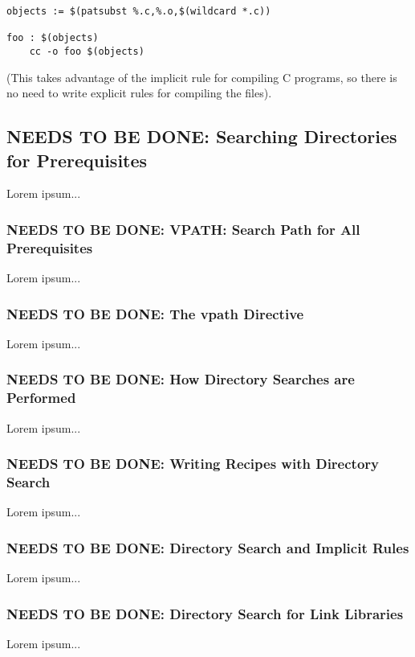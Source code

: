 \begin{verbatim}
objects := $(patsubst %.c,%.o,$(wildcard *.c))

foo : $(objects)
    cc -o foo $(objects)
\end{verbatim}
(This takes advantage of the implicit rule for compiling C programs, so there is no need to write explicit rules for compiling the files).

\color{gray}
\subsection{NEEDS TO BE DONE: Searching Directories for Prerequisites}
Lorem ipsum...
\color{black}

\color{gray}
\subsubsection{NEEDS TO BE DONE: VPATH: Search Path for All Prerequisites}
Lorem ipsum...
\color{black}

\color{gray}
\subsubsection{NEEDS TO BE DONE: The vpath Directive}
Lorem ipsum...
\color{black}

\color{gray}
\subsubsection{NEEDS TO BE DONE: How Directory Searches are Performed}
Lorem ipsum...
\color{black}

\color{gray}
\subsubsection{NEEDS TO BE DONE: Writing Recipes with Directory Search}
Lorem ipsum...
\color{black}

\color{gray}
\subsubsection{NEEDS TO BE DONE: Directory Search and Implicit Rules}
Lorem ipsum...
\color{black}

\color{gray}
\subsubsection{NEEDS TO BE DONE: Directory Search for Link Libraries}
Lorem ipsum...
\color{black}


